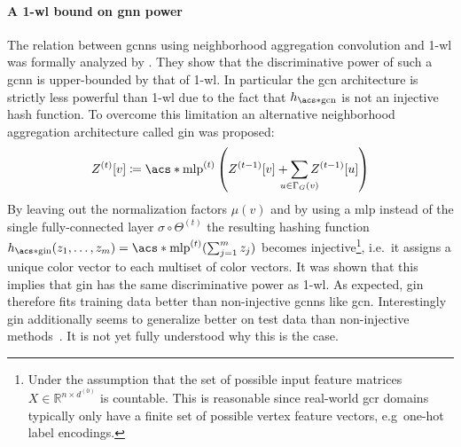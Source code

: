 \paragraph{A 1-\acs{wl} bound on \ac{gnn} power}
The relation between \acp{gcnn} using neighborhood aggregation convolution and 1-\acs{wl} was formally analyzed by \citet{Xu2018}.
They show that the discriminative power of such a \ac{gcnn} is upper-bounded by that of 1-\acs{wl}.
In particular the \ac{gcn} architecture is strictly less powerful than 1-\acs{wl} due to the fact that $h_{\mathrm{\acs*{gcn}}}$ is not an injective hash function.
To overcome this limitation an alternative neighborhood aggregation architecture called \ac{gin} was proposed:
\begin{align}
	Z^{(t)}[v] \coloneqq \mathrm{\acs*{mlp}}^{(t)}\left( Z^{(t-1)}[v] + \smashoperator[lr]{\sum_{u \in \Gamma_G(v)}} Z^{(t-1)}[u] \right)
\end{align}
By leaving out the normalization factors $\mu(v)$ and by using a \ac{mlp} instead of the single fully-connected layer $\sigma \circ \Theta^{(t)}$ the resulting hashing function $h_{\mathrm{\acs*{gin}}}(z_1, \dots, z_m) = \mathrm{\acs*{mlp}}^{(t)}(\sum_{j=1}^{m} z_j)$ becomes injective\footnote{
	Under the assumption that the set of possible input feature matrices $X \in \mathbb{R}^{n \times d^{(0)}}$ is countable.
	This is reasonable since real-world \ac{gcr} domains typically only have a finite set of possible vertex feature vectors, e.g\ one-hot label encodings.
}, i.e.\ it assigns a unique color vector to each multiset of color vectors.
It was shown that this implies that \ac{gin} has the same discriminative power as 1-\ac{wl}.
As expected, \ac{gin} therefore fits training data better than non-injective \acp{gcnn} like \ac{gcn}.
Interestingly \ac{gin} additionally seems to generalize better on test data than non-injective methods~\cite{Xu2018}\cite{Errica2020}.
It is not yet fully understood why this is the case.


